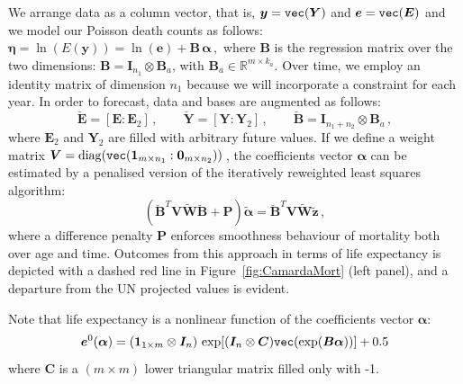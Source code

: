 \documentclass[a4paper,twoside, openright, 12pt, leqno]{article}
\begin{document}
We arrange data as a column vector, that is, $\bm{y} = \verb"vec"(\bm{Y})$ and $\bm{e} = \verb"vec"(\bm{E})$ and we model our Poisson death counts as follows: $\bm{\eta} = \ln(E(\bm{y})) = \ln(\bm{e})+ \bm{B}\,\bm{\alpha}\, , $ where $\bm{B}$ is the regression matrix over the two dimensions: $\bm{B} = \bm{I}_{n_{1}} \otimes \bm{B}_{a}$, with $\bm{B}_{a} \in \mathbb{R}^{m \times k_{a}}$. Over time, we employ an identity matrix of dimension $n_{1}$ because we will incorporate a constraint for each year. In order to forecast, data and bases are augmented as follows:
\begin{equation}\label{eq:AugData}
\breve{\bm{E}} = [\bm{E} : \bm{E}_{2}]\, , \qquad 
\breve{\bm{Y}} = [\bm{Y} : \bm{Y}_{2}]\, , \qquad
\breve{\bm{B}} = \bm{I}_{n_{1}+n_{2}} \otimes \bm{B}_{a}
\, ,
\end{equation}
where $\bm{E}_{2}$ and $\bm{Y}_{2}$ are filled with arbitrary future values. If we define a weight matrix $\bm{V} = \mathrm{diag}(\verb"vec"(\bm{1}_{m\times n_{1}}:\bm{0}_{m\times n_{2}}))\,$, the coefficients vector $\bm{\alpha}$
can be estimated by a penalised version of the iteratively reweighted least squares algorithm: 
\begin{equation}\label{eq:penIRWLSfor}
(\breve{\bm{B}}^{T} \bm{V} \tilde{\bm{W}} \breve{\bm{B}} + \bm{P}) \tilde{\bm{\alpha}} =
\breve{\bm{B}}^{T}\bm{V} \tilde{\bm{W}}\tilde{\bm{z}} \, ,
\end{equation} 	
where a difference penalty $\bm{P}$ enforces smoothness behaviour of mortality both over age and time. Outcomes from this approach in terms of life expectancy is depicted with a dashed red line in Figure~\ref{fig:CamardaMort} (left panel), and a departure from the UN projected values is evident. 

Note that life expectancy is a nonlinear function of the coefficients vector $\bm{\alpha}$:
\begin{equation}\label{eq:e0}
\bm{e}^{0} (\bm{\alpha}) = (\bm{1}_{1 \times m} \otimes \bm{I}_{n}) \, \exp[ (\bm{I}_{n} \otimes \bm{C}) \verb"vec"(\exp(\bm{B}\bm{\alpha}))]  + 0.5 
\end{equation} 
where $\bm{C}$ is a $(m \times m)$ lower triangular matrix filled only with -1. 
\end{document}

